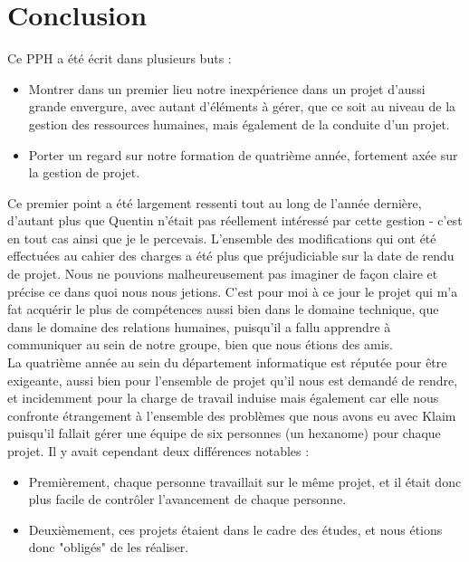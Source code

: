 \documentclass{article}
\begin{document}
	
\section{Conclusion}

		Ce PPH a été écrit dans plusieurs buts : 
		\begin{itemize}
			\item Montrer dans un premier lieu notre inexpérience dans un projet d'aussi grande envergure, avec autant d'éléments à gérer, que ce soit au niveau de la gestion des ressources humaines, mais également de la conduite d'un projet.
			\item Porter un regard sur notre formation de quatrième année, fortement axée sur la gestion de projet. \\
		\end{itemize}
		
		Ce premier point a été largement ressenti tout au long de l'année dernière, d'autant plus que Quentin n'était pas réellement intéressé par cette gestion - c'est en tout cas ainsi que je le percevais. L'ensemble des modifications qui ont été effectuées au cahier des charges a été plus que préjudiciable sur la date de rendu de projet. Nous ne pouvions malheureusement pas imaginer de façon claire et précise ce dans quoi nous nous jetions. C'est pour moi à ce jour le projet qui m'a fat acquérir le plus de compétences aussi bien dans le domaine technique, que dans le domaine des relations humaines, puisqu'il a fallu apprendre à communiquer au sein de notre groupe, bien que nous étions des amis. \\
		
		La quatrième année au sein du département informatique est réputée pour être exigeante, aussi bien  pour l'ensemble de projet qu'il nous est demandé de rendre, et incidemment pour la charge de travail induise mais également car elle nous confronte étrangement à l'ensemble des problèmes que nous avons eu avec Klaim puisqu'il fallait gérer une équipe de six personnes (un hexanome) pour chaque projet. Il y avait cependant deux différences notables :
			\begin{itemize}
				\item Premièrement, chaque personne travaillait sur le même projet, et il était donc plus facile de contrôler l'avancement de chaque personne. 
				\item Deuxièmement, ces projets étaient dans le cadre des études, et nous étions donc "obligés" de les réaliser.\\
			\end{itemize}
		
\end{document}
